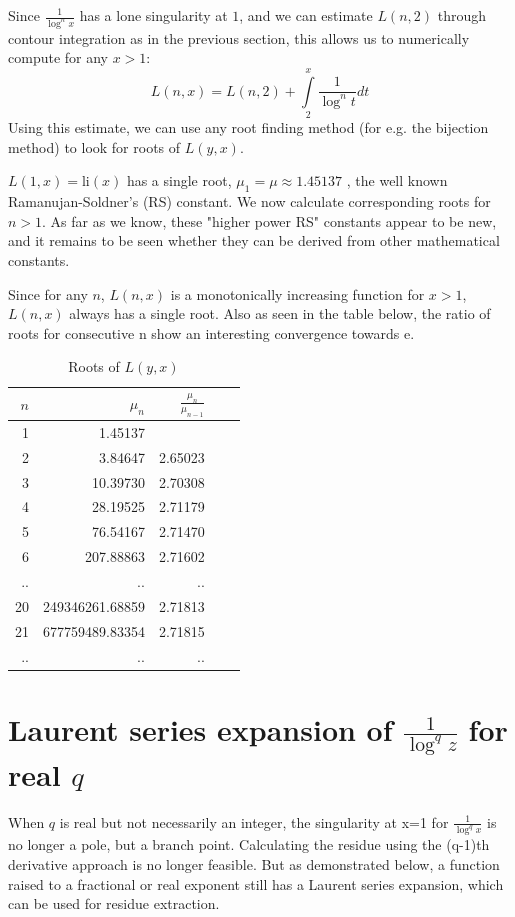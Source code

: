 \documentclass[a4paper,11pt,twoside]{amsart}
\newcommand\li{\mathrm{li}}
\begin{document}
Since $\frac{1}{\log^{n} x}$ has a lone singularity at $1$, and we can estimate $L(n,2)$ through contour integration as in the previous section, this allows us to numerically compute for any $x>1$:
\begin{equation}\label{lrootsn}
 L(n,x) = L(n,2) + \int\limits_{2}^{x} \frac{1}{\log^{n} t} dt
\end{equation}
Using this estimate, we can use any root finding method (for e.g. the bijection method) to look for roots of $L(y,x)$. 

$L(1,x) = \li(x)$ has a single root, $\mu_1 = \mu \approx 1.45137$ \cite{rama}, the well known Ramanujan-Soldner's (RS) constant.
We now calculate corresponding roots for $n>1$. As far as we know, these "higher power RS" constants appear to be new, and it remains to be seen whether they can be derived from other mathematical constants. 

Since for any $n$, $L(n,x)$ is a monotonically increasing function for $x>1$, $L(n,x)$ always has a single root. Also as seen in the table below, the ratio of roots for consecutive n show an interesting convergence towards e. 

\begin{table}[H]
  \begin{center}
    \begin{tabular}{r|r|r|r|r} %
      $n$ & $\mu_{n}$ & $\frac{\mu_{n}}{\mu_{n-1}}$\\
      \hline
      1 & 1.45137 & \\
      2 & 3.84647 & 2.65023\\
      3 & 10.39730 & 2.70308\\
      4 & 28.19525 & 2.71179\\
      5 & 76.54167 & 2.71470\\
      6 & 207.88863 & 2.71602\\
      .. & .. & ..\\
      20 & 249346261.68859 & 2.71813\\
      21 & 677759489.83354 & 2.71815\\
      .. & .. & ..\\
    \end{tabular}
    \caption{Roots of $L(y,x)$}
  \end{center}
\end{table}
\vspace{-2em}

\section{Laurent series expansion of $\frac{1}{\log^q z}$ for real $q$}
When $q$ is real but not necessarily an integer, the singularity at x=1 for $\frac{1}{\log^{q} x}$ is no longer a pole, but a branch point. Calculating the residue using the (q-1)th derivative approach is no longer feasible. But as demonstrated below, a function raised to a fractional or real exponent still has a Laurent series expansion, which can be used for residue extraction.
\end{document}
